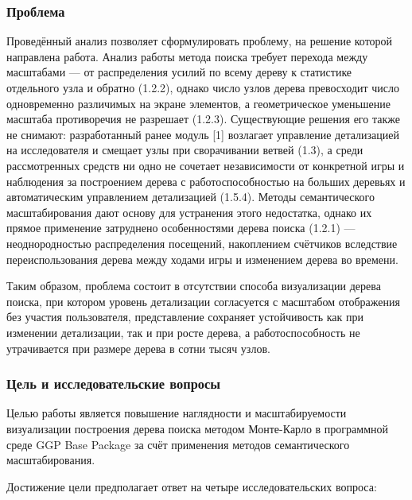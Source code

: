 \subsubsection{Проблема}

Проведённый анализ позволяет сформулировать проблему, на решение которой направлена работа. Анализ работы метода поиска требует перехода между масштабами — от распределения усилий по всему дереву к статистике отдельного узла и обратно (1.2.2), однако число узлов дерева превосходит число одновременно различимых на экране элементов, а геометрическое уменьшение масштаба противоречия не разрешает (1.2.3). Существующие решения его также не снимают: разработанный ранее модуль [1] возлагает управление детализацией на исследователя и смещает узлы при сворачивании ветвей (1.3), а среди рассмотренных средств ни одно не сочетает независимости от конкретной игры и наблюдения за построением дерева с работоспособностью на больших деревьях и автоматическим управлением детализацией (1.5.4). Методы семантического масштабирования дают основу для устранения этого недостатка, однако их прямое применение затруднено особенностями дерева поиска (1.2.1) — неоднородностью распределения посещений, накоплением счётчиков вследствие переиспользования дерева между ходами игры и изменением дерева во времени.

Таким образом, проблема состоит в отсутствии способа визуализации дерева поиска, при котором уровень детализации согласуется с масштабом отображения без участия пользователя, представление сохраняет устойчивость как при изменении детализации, так и при росте дерева, а работоспособность не утрачивается при размере дерева в сотни тысяч узлов.

\subsubsection{Цель и исследовательские вопросы}

Целью работы является повышение наглядности и масштабируемости визуализации построения дерева поиска методом Монте-Карло в программной среде GGP Base Package за счёт применения методов семантического масштабирования.

Достижение цели предполагает ответ на четыре исследовательских вопроса:

